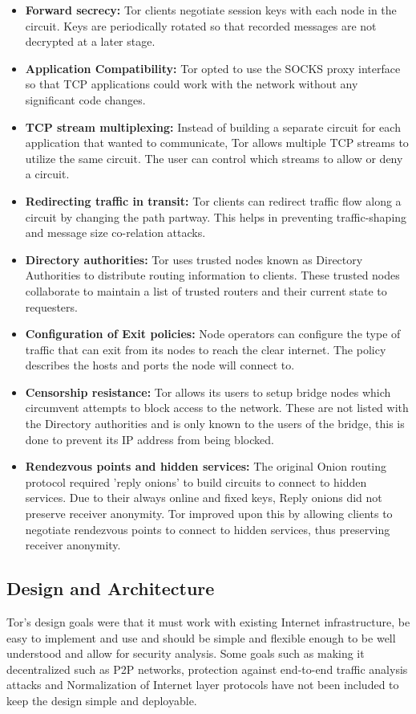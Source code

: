 \documentclass{llncs}
\begin{document}
\begin{itemize}
	\item[]{\textbf{Forward secrecy:} Tor clients negotiate session keys with each node in the circuit. Keys are periodically rotated so that recorded messages are not decrypted at a later stage.}
	\item[]{\textbf{Application Compatibility:} Tor opted to use the SOCKS proxy interface so that TCP applications could work with the network without any significant code changes.}
	\item[]{\textbf{TCP stream multiplexing:} Instead of building a separate circuit for each application that wanted to communicate, Tor allows multiple TCP streams to utilize the same circuit. The user can control which streams to allow or deny a circuit.}
	\item[]{\textbf{Redirecting traffic in transit:} Tor clients can redirect traffic flow along a circuit by changing the path partway. This helps in preventing traffic-shaping and message size co-relation attacks.}
	\item[]{\textbf{Directory authorities:} Tor uses trusted nodes known as Directory Authorities to distribute routing information to clients. These trusted nodes collaborate to maintain a list of trusted routers and their current state to requesters.}
	\item[]{\textbf{Configuration of Exit policies:} Node operators can configure the type of traffic that can exit from its nodes to reach the clear internet. The policy describes the hosts and ports the node will connect to.}
	\item[]{\textbf{Censorship resistance:} Tor allows its users to setup bridge nodes which circumvent attempts to block access to the network. These are not listed with the Directory authorities and is only known to the users of the bridge, this is done to prevent its IP address from being blocked.}
	\item[]{\textbf{Rendezvous points and hidden services:} The original Onion routing protocol required 'reply onions' to build circuits to connect to hidden services. Due to their always online and fixed keys, Reply onions did not preserve receiver anonymity. Tor improved upon this by allowing clients to negotiate rendezvous points to connect to hidden services, thus preserving receiver anonymity.}
\end{itemize}

\subsection{Design and Architecture}
Tor's design goals were that it must work with existing Internet infrastructure, be easy to implement and use and should be simple and flexible enough to be well understood and allow for security analysis. Some goals such as making it decentralized such as P2P networks, protection against end-to-end traffic analysis attacks and Normalization of Internet layer protocols have not been included to keep the design simple and deployable.
\end{document}
